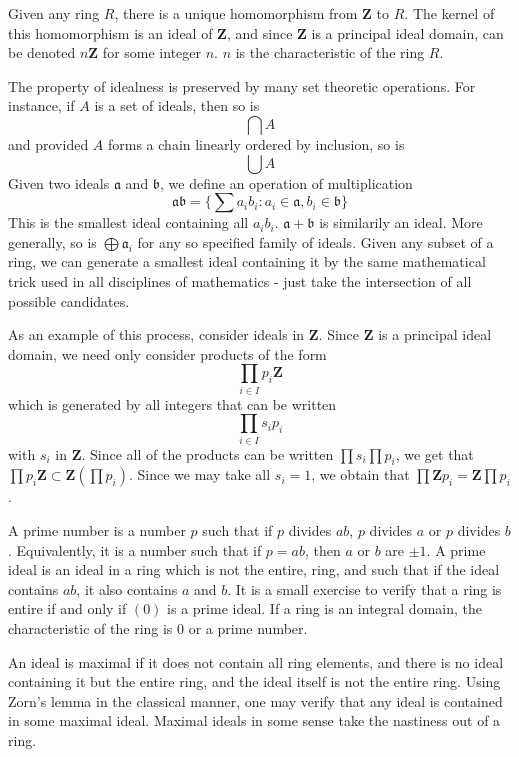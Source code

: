 Given any ring $R$, there is a unique homomorphism from $\mathbf{Z}$ to $R$. The kernel of this homomorphism is an ideal of $\mathbf{Z}$, and since $\mathbf{Z}$ is a principal ideal domain, can be denoted $n\mathbf{Z}$ for some integer $n$. $n$ is the characteristic of the ring $R$.

The property of idealness is preserved by many set theoretic operations. For instance, if $A$ is a set of ideals, then so is
%
\[ \bigcap A \]
%
and provided $A$ forms a chain linearly ordered by inclusion, so is
%
\[ \bigcup A \]
%
Given two ideals $\mathfrak{a}$ and $\mathfrak{b}$, we define an operation of multiplication
%
\[ \mathfrak{a} \mathfrak{b} = \{ \sum a_i b_i : a_i \in \mathfrak{a}, b_i \in \mathfrak{b} \} \]
%
This is the smallest ideal containing all $a_i b_i$. $\mathfrak{a} + \mathfrak{b}$ is similarily an ideal. More generally, so is $\bigoplus \mathfrak{a}_i$ for any so specified family of ideals. Given any subset of a ring, we can generate a smallest ideal containing it by the same mathematical trick used in all disciplines of mathematics - just take the intersection of all possible candidates.

As an example of this process, consider ideals in $\mathbf{Z}$. Since $\mathbf{Z}$ is a principal ideal domain, we need only consider products of the form
%
\[ \prod_{i \in I} p_i \mathbf{Z} \]
%
which is generated by all integers that can be written
%
\[ \prod_{i \in I} s_i p_i \]
%
with $s_i$ in $\mathbf{Z}$. Since all of the products can be written $\prod s_i \prod p_i$, we get that $\prod p_i \mathbf{Z} \subset \mathbf{Z}(\prod p_i)$. Since we may take all $s_i = 1$, we obtain that $\prod \mathbf{Z} p_i = \mathbf{Z} \prod p_i$.

A prime number is a number $p$ such that if $p$ divides $ab$, $p$ divides $a$ or $p$ divides $b$. Equivalently, it is a number such that if $p = ab$, then $a$ or $b$ are $\pm 1$. A prime ideal is an ideal in a ring which is not the entire, ring, and such that if the ideal contains $ab$, it also contains $a$ and $b$. It is a small exercise to verify that a ring is entire if and only if $(0)$ is a prime ideal. If a ring is an integral domain, the characteristic of the ring is $0$ or a prime number.

An ideal is maximal if it does not contain all ring elements, and there is no ideal containing it but the entire ring, and the ideal itself is not the entire ring. Using Zorn's lemma in the classical manner, one may verify that any ideal is contained in some maximal ideal. Maximal ideals in some sense take the nastiness out of a ring.

